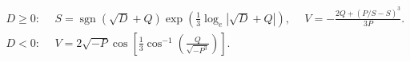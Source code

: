 \documentclass[10pt]{article}
\begin{document}
\begin{align*}D \ge 0: \ \
&  S = \operatorname{sgn}(\sqrt{D} + Q) \exp{ \left( \frac{1}{3} \log_{e} \left| \sqrt{D} + Q \right| \right) } , 
\ \
&  V = - \frac{ 2 Q + \left( P / S - S \right)^3 }{3 P} .
\\
D < 0: \ \
&  V = 2 \sqrt{-P} \cos \left[ \frac{ 1 }{3} \cos^{-1} \left( \frac{ Q }{ \sqrt{- P^3} } \right) \right] .\end{align*}
\end{document}
